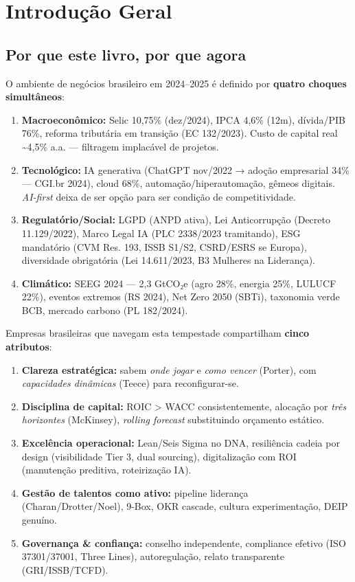 \chapter*{Introdução Geral}

\section*{Por que este livro, por que agora}

O ambiente de negócios brasileiro em 2024–2025 é definido por \textbf{quatro choques simultâneos}:
\begin{enumerate}
    \item \textbf{Macroeconômico:} Selic 10,75\% (dez/2024), IPCA 4,6\% (12m), dívida/PIB 76\%, reforma tributária em transição (EC 132/2023). Custo de capital real \textasciitilde 4,5\% a.a. — filtragem implacável de projetos.
    \item \textbf{Tecnológico:} IA generativa (ChatGPT nov/2022 → adoção empresarial 34\% — CGI.br 2024), cloud 68\%, automação/hiperautomação, gêmeos digitais. \textit{AI-first} deixa de ser opção para ser condição de competitividade.
    \item \textbf{Regulatório/Social:} LGPD (ANPD ativa), Lei Anticorrupção (Decreto 11.129/2022), Marco Legal IA (PLC 2338/2023 tramitando), ESG mandatório (CVM Res. 193, ISSB S1/S2, CSRD/ESRS se Europa), diversidade obrigatória (Lei 14.611/2023, B3 Mulheres na Liderança).
    \item \textbf{Climático:} SEEG 2024 — 2,3 GtCO₂e (agro 28\%, energia 25\%, LULUCF 22\%), eventos extremos (RS 2024), Net Zero 2050 (SBTi), taxonomia verde BCB, mercado carbono (PL 182/2024).
\end{enumerate}

Empresas brasileiras que navegam esta tempestade compartilham \textbf{cinco atributos}:
\begin{enumerate}
    \item \textbf{Clareza estratégica:} sabem \textit{onde jogar} e \textit{como vencer} (Porter), com \textit{capacidades dinâmicas} (Teece) para reconfigurar-se.
    \item \textbf{Disciplina de capital:} ROIC > WACC consistentemente, alocação por \textit{três horizontes} (McKinsey), \textit{rolling forecast} substituindo orçamento estático.
    \item \textbf{Excelência operacional:} Lean/Seis Sigma no DNA, resiliência cadeia por design (visibilidade Tier 3, dual sourcing), digitalização com ROI (manutenção preditiva, roteirização IA).
    \item \textbf{Gestão de talentos como ativo:} pipeline liderança (Charan/Drotter/Noel), 9-Box, OKR cascade, cultura experimentação, DEIP genuíno.
    \item \textbf{Governança \& confiança:} conselho independente, compliance efetivo (ISO 37301/37001, Three Lines), autoregulação, relato transparente (GRI/ISSB/TCFD).
\end{enumerate}

